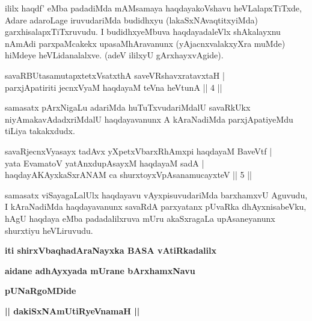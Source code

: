 \begin{artha}
ililx haqdf' eMba padadiMda mAMsamaya haqdayakoVshavu heVLalapxTiTxde, Adare adaroLage iruvudariMda budidhxyu (lakaSxNAvaqtitxyiMda) garxhisalapxTiTxruvudu. I budidhxyeMbuva haqdayadaleVlx shAkalayxnu nAmAdi parxpaMcakekx upasaMhAravanunx (yAjacnxvalakxyXra muMde) hiMdeye heVLidanalalxve. (adeV ililxyU gArxhayxvAgide).
\end{artha}


\begin{shl}
savaRBUtasamutapxtetxVsatxthA saveVRshavxratavxtaH | \\
parxjApatiriti jecnxVyaM haqdayaM teVna heVtunA \hfill ||  4 || 
\end{shl}

\begin{artha}
samasatx pArxNigaLu adariMda huTuTxvudariMdalU savaRkUkx niyAmakavAdadxriMdalU haqdayavanunx A kAraNadiMda parxjApatiyeMdu tiLiya takakxdudx.
\end{artha}


\begin{shl}
savaRjecnxVyasayx tadAvx	yXpetxVbarxRhAmxpi haqdayaM BaveVtf | \\
yata EvamatoV yatAnxdupAsayxM haqdayaM sadA  | \\
 haqdayAKAyxkaSxrANAM ca shurxtoyxVpAsanamucayxteV \hfill ||  5 ||
\end{shl}

\begin{artha}
samasatx viSayagaLalUlx haqdayavu vAyxpisuvudariMda barxhamxvU Aguvudu, I kAraNadiMda haqdayavanunx savaRdA parxyatanx pUvaRka dhAyxnisabeVku, hAgU haqdaya eMba padadalilxruva mUru akaSxragaLa upAsaneyanunx shurxtiyu heVLiruvudu.
\end{artha}

\begin{center}
{\bf iti shirxVbaqhadAraNayxka BASA vAtiRkadalilx}
\medskip

{\bf aidane adhAyxyada mUrane bArxhamxNavu}

\smallskip
{\bf pUNaRgoMDide}

\smallskip
{\bf || dakiSxNAmUtiRyeVnamaH ||}
\end{center}

\bigskip

